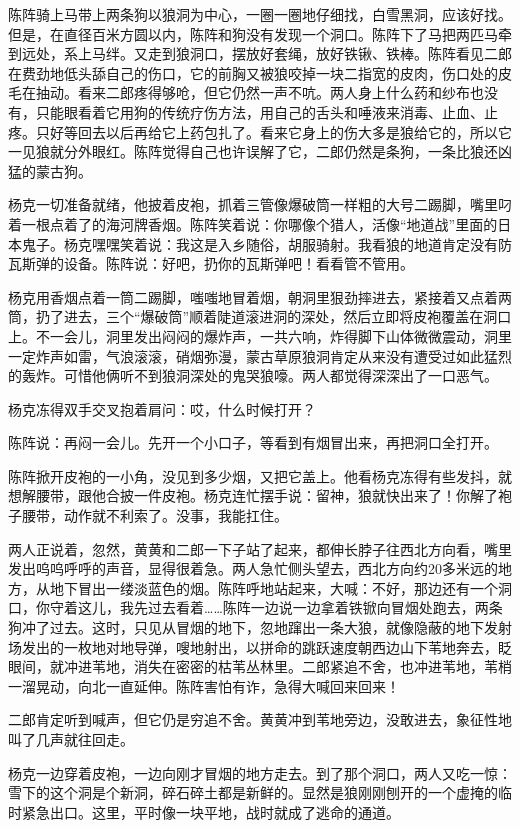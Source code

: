 \par 陈阵骑上马带上两条狗以狼洞为中心，一圈一圈地仔细找，白雪黑洞，应该好找。但是，在直径百米方圆以内，陈阵和狗没有发现一个洞口。陈阵下了马把两匹马牵到远处，系上马绊。又走到狼洞口，摆放好套绳，放好铁锹、铁棒。陈阵看见二郎在费劲地低头舔自己的伤口，它的前胸又被狼咬掉一块二指宽的皮肉，伤口处的皮毛在抽动。看来二郎疼得够呛，但它仍然一声不吭。两人身上什么药和纱布也没有，只能眼看着它用狗的传统疗伤方法，用自己的舌头和唾液来消毒、止血、止疼。只好等回去以后再给它上药包扎了。看来它身上的伤大多是狼给它的，所以它一见狼就分外眼红。陈阵觉得自己也许误解了它，二郎仍然是条狗，一条比狼还凶猛的蒙古狗。
\par 杨克一切准备就绪，他披着皮袍，抓着三管像爆破筒一样粗的大号二踢脚，嘴里叼着一根点着了的海河牌香烟。陈阵笑着说：你哪像个猎人，活像“地道战”里面的日本鬼子。杨克嘿嘿笑着说：我这是入乡随俗，胡服骑射。我看狼的地道肯定没有防瓦斯弹的设备。陈阵说：好吧，扔你的瓦斯弹吧！看看管不管用。
\par 杨克用香烟点着一筒二踢脚，嗤嗤地冒着烟，朝洞里狠劲摔进去，紧接着又点着两筒，扔了进去，三个“爆破筒”顺着陡道滚进洞的深处，然后立即将皮袍覆盖在洞口上。不一会儿，洞里发出闷闷的爆炸声，一共六响，炸得脚下山体微微震动，洞里一定炸声如雷，气浪滚滚，硝烟弥漫，蒙古草原狼洞肯定从来没有遭受过如此猛烈的轰炸。可惜他俩听不到狼洞深处的鬼哭狼嚎。两人都觉得深深出了一口恶气。
\par 杨克冻得双手交叉抱着肩问：哎，什么时候打开？
\par 陈阵说：再闷一会儿。先开一个小口子，等看到有烟冒出来，再把洞口全打开。
\par 陈阵掀开皮袍的一小角，没见到多少烟，又把它盖上。他看杨克冻得有些发抖，就想解腰带，跟他合披一件皮袍。杨克连忙摆手说：留神，狼就快出来了！你解了袍子腰带，动作就不利索了。没事，我能扛住。
\par 两人正说着，忽然，黄黄和二郎一下子站了起来，都伸长脖子往西北方向看，嘴里发出呜呜呼呼的声音，显得很着急。两人急忙侧头望去，西北方向约20多米远的地方，从地下冒出一缕淡蓝色的烟。陈阵呼地站起来，大喊：不好，那边还有一个洞口，你守着这儿，我先过去看着……陈阵一边说一边拿着铁锨向冒烟处跑去，两条狗冲了过去。这时，只见从冒烟的地下，忽地蹿出一条大狼，就像隐蔽的地下发射场发出的一枚地对地导弹，嗖地射出，以拼命的跳跃速度朝西边山下苇地奔去，眨眼间，就冲进苇地，消失在密密的枯苇丛林里。二郎紧追不舍，也冲进苇地，苇梢一溜晃动，向北一直延伸。陈阵害怕有诈，急得大喊回来回来！
\par 二郎肯定听到喊声，但它仍是穷追不舍。黄黄冲到苇地旁边，没敢进去，象征性地叫了几声就往回走。
\par 杨克一边穿着皮袍，一边向刚才冒烟的地方走去。到了那个洞口，两人又吃一惊：雪下的这个洞是个新洞，碎石碎土都是新鲜的。显然是狼刚刚刨开的一个虚掩的临时紧急出口。这里，平时像一块平地，战时就成了逃命的通道。
